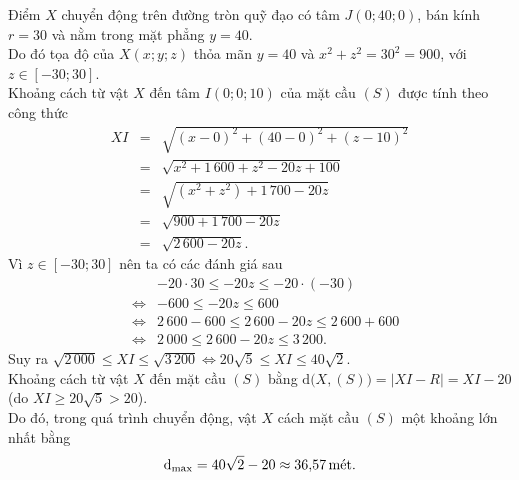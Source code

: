 \begin{ex}
{\begin{itemchoice}
\begin{center}
			\end{center}
			Điểm $X$ chuyển động trên đường tròn quỹ đạo có tâm $J(0;40;0)$, bán kính $r=30$ và nằm trong mặt phẳng $y=40$.\\
			Do đó tọa độ của $X(x;y;z)$ thỏa mãn $y=40$ và $x^2+z^2=30^2=900$, với $z\in[-30;30]$.\\
			Khoảng cách từ vật $X$ đến tâm $I(0;0;10)$ của mặt cầu $(S)$ được tính theo công thức
			\allowdisplaybreaks
			\begin{eqnarray*}
				XI&=&\sqrt{(x-0)^2+(40-0)^2+(z-10)^2}
				\\
				&=&\sqrt{x^2+1\,600+z^2-20z+100}
				\\
				&=&\sqrt{(x^2+z^2)+1\,700-20z}
				\\
				&=&\sqrt{900+1\,700-20z}
				\\
				&=&\sqrt{2\,600-20z}.
			\end{eqnarray*}
			Vì $z\in[-30;30]$ nên ta có các đánh giá sau
			\allowdisplaybreaks
			\begin{eqnarray*}
				&&-20\cdot30\le-20z\le-20\cdot(-30)
				\\
				&\Leftrightarrow&-600\le-20z\le600
				\\
				&\Leftrightarrow&2\,600-600\le2\,600-20z\le2\,600+600
				\\
				&\Leftrightarrow&2\,000\le2\,600-20z\le3\,200.
			\end{eqnarray*}
			Suy ra $\sqrt{2\,000}\le XI\le\sqrt{3\,200}\Leftrightarrow20\sqrt{5}\le XI\le40\sqrt{2}$.\\
			Khoảng cách từ vật $X$ đến mặt cầu $(S)$ bằng $\mathrm{d}\big(X,(S)\big)=|XI-R|=XI-20$ (do $XI\ge20\sqrt{5}>20$).\\
			Do đó, trong quá trình chuyển động, vật $X$ cách mặt cầu $(S)$ một khoảng lớn nhất bằng
			\[\mathrm{d}_{\max}=40\sqrt{2}-20\approx36{,}57\text{\,mét}.\]
		\end{itemchoice}
	}
\end{ex}

